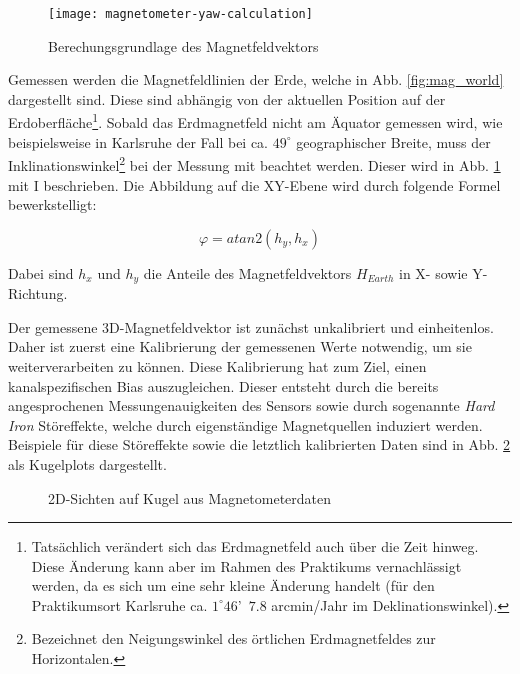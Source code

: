 \begin{figure}[h]
   \centering
   \texttt{[image: magnetometer-yaw-calculation]}
   \caption[mag_mapping]{Berechungsgrundlage des Magnetfeldvektors\cite{wang2006intelligent}}
   \label{fig:mag_mapping}
\end{figure}

Gemessen werden die Magnetfeldlinien der Erde, welche in Abb. \ref{fig:mag_world} dargestellt sind.
Diese sind abhängig von der aktuellen Position auf der Erdoberfläche\footnote{Tatsächlich verändert sich das Erdmagnetfeld auch über die Zeit hinweg.
Diese Änderung kann aber im Rahmen des Praktikums vernachlässigt werden, da es sich um eine sehr kleine Änderung handelt (\zB für den Praktikumsort Karlsruhe ca. $1^\circ 46$'~$7.8$ arcmin/Jahr im Deklinationswinkel).}.
Sobald das Erdmagnetfeld nicht am Äquator gemessen wird, wie beispielsweise in Karlsruhe der Fall bei ca. $49^\circ$ geographischer Breite, muss der Inklinationswinkel\footnote{Bezeichnet den Neigungswinkel des örtlichen Erdmagnetfeldes zur Horizontalen.} bei der Messung mit beachtet werden.
Dieser wird in Abb. \ref{fig:mag_mapping} mit I beschrieben.
Die Abbildung  auf die XY-Ebene wird durch folgende Formel bewerkstelligt:

\begin{equation}
    \varphi = atan2(h_y,h_x)
\end{equation}

Dabei sind $h_x$ und $h_y$ die Anteile des Magnetfeldvektors $H_{Earth}$ in X- sowie Y-Richtung.

Der gemessene 3D-Magnetfeldvektor ist zunächst unkalibriert und einheitenlos.
Daher ist zuerst eine Kalibrierung der gemessenen Werte notwendig, um sie weiterverarbeiten zu können.
Diese Kalibrierung hat zum Ziel, einen kanalspezifischen Bias auszugleichen. 
Dieser entsteht durch die bereits angesprochenen Messungenauigkeiten des Sensors sowie durch sogenannte \textit{Hard Iron} Störeffekte, welche durch eigenständige Magnetquellen induziert werden.
Beispiele für diese Störeffekte sowie die letztlich kalibrierten Daten sind in Abb. \ref{fig:mag_kugel_plots} als Kugelplots dargestellt.

\begin{figure}[ht]
\centering
{}

\caption[]{2D-Sichten auf Kugel aus Magnetometerdaten}
\label{fig:mag_kugel_plots}
\end{figure}

